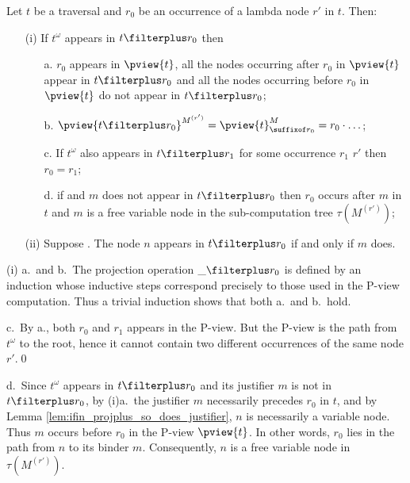 \begin{lemma}
\label{lem:pviewproj_traversal} Let $t$ be a traversal and
$r_0$ be an occurrence of a lambda node $r'$ in $t$. Then:
\begin{itemize}
\item[(i)] If $t^\omega$ appears in $t\filterplus r_0$ then
    \begin{itemize}
    \item[a.] $r_0$ appears in $\pview{t}$, all the nodes occurring after $r_0$ in $\pview{t}$ appear in $t\filterplus r_0$
    and all the nodes occurring before $r_0$ in $\pview{t}$ do not appear in $t\filterplus r_0$;

    \item[b.] $\pview{t\filterplus r_0}^{M^{(r')}} = \pview{t}^M_{\suffixof r_0} = r_0\cdot \ldots$; %

    \item[c.] If $t^\omega$ also appears in $t\filterplus r_1$ for some occurrence $r_1$ $r'$ then $r_0 = r_1$;

    \item[d.] if  and $m$ does not appear in $t\filterplus r_0$ then
    $r_0$ occurs after $m$ in $t$ and $m$ is a free variable
    node in the sub-computation tree $\tau(M^{(r')})$;
    \end{itemize}
\item[(ii)] Suppose . The node  $n$ appears in $t\filterplus r_0$ if and only if $m$ does.
\end{itemize}
\end{lemma}
\proof (i) a.\ and b.\  The projection operation $\_ \filterplus r_0$ is
defined by an induction whose inductive steps correspond precisely
to those used in the P-view computation. Thus a trivial induction
shows that both a.\ and b.\ hold.

c.\ By a., both $r_0$ and $r_1$ appears in the P-view. But the
P-view is the path from $t^\omega$ to the root, hence it cannot
contain two different occurrences of the same node $r'$.\qed

d.\ Since $t^\omega$ appears in $t\filterplus r_0$ and its justifier
$m$ is not in $t\filterplus r_0$, by (i)a.\ the justifier $m$
necessarily precedes $r_0$ in $t$, and by Lemma
\ref{lem:ifin_projplus_so_does_justifier}, $n$ is necessarily a variable node.
Thus $m$ occurs before $r_0$ in the P-view $\pview{t}$. In other words, $r_0$ lies in the path from
$n$ to its binder $m$. Consequently, $n$ is a free variable node in
$\tau(M^{(r')})$.

